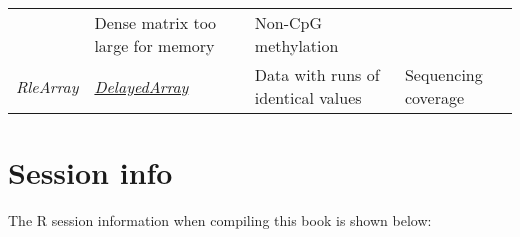 \documentclass[]{book}
\begin{document}
\begin{longtable}[]{@{}llll@{}}
\begin{minipage}[t]{0.28\columnwidth}
\end{minipage} & \begin{minipage}[t]{0.25\columnwidth}\raggedright\strut
Dense matrix too large for memory\strut
\end{minipage} & \begin{minipage}[t]{0.25\columnwidth}\raggedright\strut
Non-CpG methylation\strut
\end{minipage}\tabularnewline
\begin{minipage}[t]{0.10\columnwidth}\raggedright\strut
\emph{RleArray}\strut
\end{minipage} & \begin{minipage}[t]{0.28\columnwidth}\raggedright\strut
\emph{\href{http://bioconductor.org/packages/DelayedArray}{DelayedArray}}\strut
\end{minipage} & \begin{minipage}[t]{0.25\columnwidth}\raggedright\strut
Data with runs of identical values\strut
\end{minipage} & \begin{minipage}[t]{0.25\columnwidth}\raggedright\strut
Sequencing coverage\strut
\end{minipage}\tabularnewline
\bottomrule
\end{longtable}

\section{Session info}\label{session-info}

The R session information when compiling this book is shown below:
\end{document}
